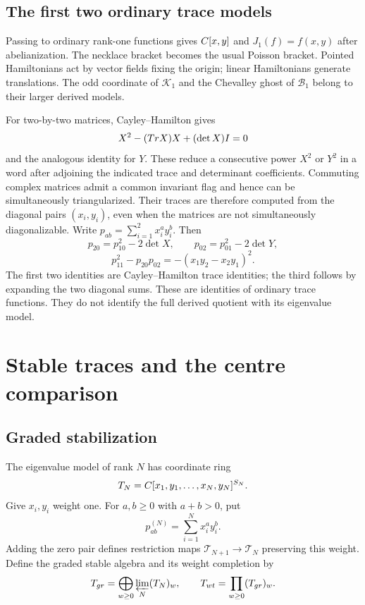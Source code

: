 \section{The first two ordinary trace models}
Passing to ordinary rank-one functions gives $\C[x,y]$ and
$J_1(f)=f(x,y)$ after abelianization.
The necklace bracket becomes the usual Poisson bracket.
Pointed Hamiltonians act by vector fields fixing the origin; linear
Hamiltonians generate translations.  The odd coordinate of
$\mathcal K_1$ and the Chevalley ghost of $\mathcal B_1$ belong to
their larger derived models.

For two-by-two matrices, Cayley--Hamilton gives
\[
 X^2-(\Tr X)X+(\det X)I=0
\]
and the analogous identity for $Y$.
These reduce a consecutive power $X^2$ or $Y^2$ in a word after
adjoining the indicated trace and determinant coefficients.
Commuting complex matrices admit a common invariant flag and hence
can be simultaneously triangularized.  Their traces are therefore
computed from the diagonal pairs $(x_i,y_i)$, even when the matrices
are not simultaneously diagonalizable.
Write $p_{ab}=\sum_{i=1}^2x_i^ay_i^b$.
Then
\[
 p_{20}=p_{10}^2-2\det X,\qquad
 p_{02}=p_{01}^2-2\det Y,
\]
\[
 p_{11}^2-p_{20}p_{02}
 =-(x_1y_2-x_2y_1)^2.
\]
The first two identities are Cayley--Hamilton trace identities; the
third follows by expanding the two diagonal sums.
These are identities of ordinary trace functions.  They do not
identify the full derived quotient with its eigenvalue model.

\chapter{Stable traces and the centre comparison}
\section{Graded stabilization}
The eigenvalue model of rank $N$ has coordinate ring
\[
 \mathcal T_N=
 \C[x_1,y_1,\ldots,x_N,y_N]^{S_N}.
\]
Give $x_i,y_i$ weight one.  For $a,b\ge0$ with $a+b>0$, put
\[
 p_{ab}^{(N)}=\sum_{i=1}^Nx_i^ay_i^b.
\]
Adding the zero pair defines restriction maps
$\mathcal T_{N+1}\to\mathcal T_N$ preserving this weight.
Define the graded stable algebra and its weight completion by
\[
 \mathcal T_{\mathrm{gr}}
 =\bigoplus_{w\ge0}\varprojlim_N(\mathcal T_N)_w,
 \qquad
 \widehat{\mathcal T}_{\mathrm{wt}}
 =\prod_{w\ge0}(\mathcal T_{\mathrm{gr}})_w.
\]

